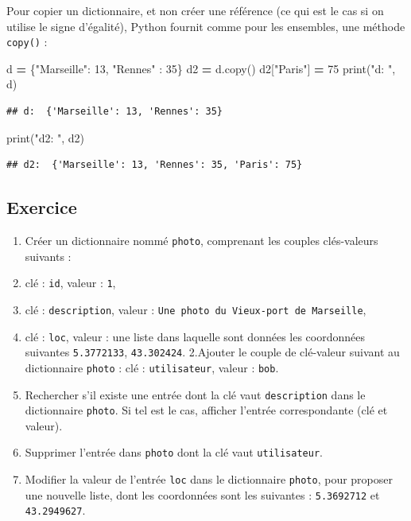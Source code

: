 \documentclass[12pt,]{book}
\newenvironment{Shaded}{\begin{snugshade}}{\end{snugshade}}
\newcommand{\DecValTok}[1]{\textcolor[rgb]{0.00,0.00,0.81}{#1}}
\newcommand{\StringTok}[1]{\textcolor[rgb]{0.31,0.60,0.02}{#1}}
\newcommand{\OperatorTok}[1]{\textcolor[rgb]{0.81,0.36,0.00}{\textbf{#1}}}
\newcommand{\BuiltInTok}[1]{#1}
\newcommand{\NormalTok}[1]{#1}
\providecommand{\tightlist}{%
  \setlength{\itemsep}{0pt}\setlength{\parskip}{0pt}}
\numberwithin{equation}{section}
\numberwithin{countremarque}{section}
\let\BeginKnitrBlock\begin \let\EndKnitrBlock\end
\begin{document}
Pour copier un dictionnaire, et non créer une référence (ce qui est le
cas si on utilise le signe d'égalité), Python fournit comme pour les
ensembles, une méthode \texttt{copy()} :

\begin{Shaded}
\begin{Highlighting}[]
\NormalTok{d }\OperatorTok{=}\NormalTok{ \{}\StringTok{"Marseille"}\NormalTok{: }\DecValTok{13}\NormalTok{, }\StringTok{"Rennes"}\NormalTok{ : }\DecValTok{35}\NormalTok{\}}
\NormalTok{d2 }\OperatorTok{=}\NormalTok{ d.copy()}
\NormalTok{d2[}\StringTok{"Paris"}\NormalTok{] }\OperatorTok{=} \DecValTok{75}
\BuiltInTok{print}\NormalTok{(}\StringTok{"d: "}\NormalTok{, d)}
\end{Highlighting}
\end{Shaded}

\begin{lstlisting}
## d:  {'Marseille': 13, 'Rennes': 35}
\end{lstlisting}

\begin{Shaded}
\begin{Highlighting}[]
\BuiltInTok{print}\NormalTok{(}\StringTok{"d2: "}\NormalTok{, d2)}
\end{Highlighting}
\end{Shaded}

\begin{lstlisting}
## d2:  {'Marseille': 13, 'Rennes': 35, 'Paris': 75}
\end{lstlisting}

\subsection{Exercice}\label{exercice-1}

\BeginKnitrBlock{exframe}
\begin{enumerate}
\def\labelenumi{\arabic{enumi}.}
\tightlist
\item
  Créer un dictionnaire nommé \texttt{photo}, comprenant les couples
  clés-valeurs suivants :
\item
  clé : \texttt{id}, valeur : \texttt{1},
\item
  clé : \texttt{description}, valeur :
  \texttt{Une\ photo\ du\ Vieux-port\ de\ Marseille},
\item
  clé : \texttt{loc}, valeur : une liste dans laquelle sont données les
  coordonnées suivantes \texttt{5.3772133}, \texttt{43.302424}.
  2.Ajouter le couple de clé-valeur suivant au dictionnaire
  \texttt{photo} : clé : \texttt{utilisateur}, valeur : \texttt{bob}.
\item
  Rechercher s'il existe une entrée dont la clé vaut
  \texttt{description} dans le dictionnaire \texttt{photo}. Si tel est
  le cas, afficher l'entrée correspondante (clé et valeur).
\item
  Supprimer l'entrée dans \texttt{photo} dont la clé vaut
  \texttt{utilisateur}.
\item
  Modifier la valeur de l'entrée \texttt{loc} dans le dictionnaire
  \texttt{photo}, pour proposer une nouvelle liste, dont les coordonnées
  sont les suivantes : \texttt{5.3692712} et \texttt{43.2949627}.
\end{enumerate}
\EndKnitrBlock{exframe}
\end{document}
